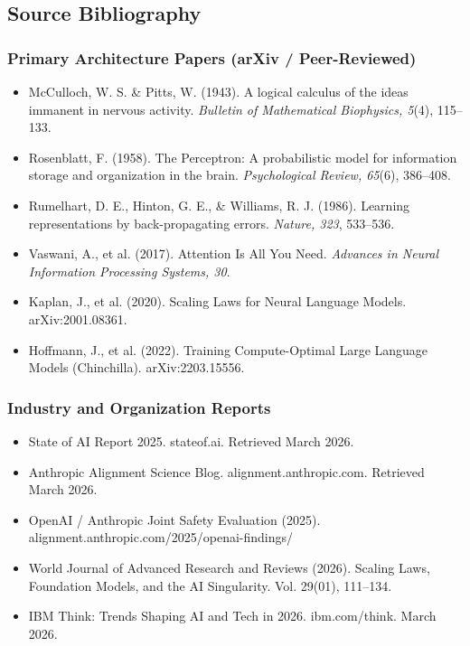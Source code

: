 \documentclass[11pt,letterpaper]{article}
\begin{document}
\subsection{Source Bibliography}

\subsubsection{Primary Architecture Papers (arXiv / Peer-Reviewed)}
\begin{itemize}[leftmargin=*]
\item McCulloch, W. S. \& Pitts, W. (1943). A logical calculus of the ideas immanent in nervous activity. \textit{Bulletin of Mathematical Biophysics, 5}(4), 115--133.
\item Rosenblatt, F. (1958). The Perceptron: A probabilistic model for information storage and organization in the brain. \textit{Psychological Review, 65}(6), 386--408.
\item Rumelhart, D. E., Hinton, G. E., \& Williams, R. J. (1986). Learning representations by back-propagating errors. \textit{Nature, 323}, 533--536.
\item Vaswani, A., et al. (2017). Attention Is All You Need. \textit{Advances in Neural Information Processing Systems, 30}.
\item Kaplan, J., et al. (2020). Scaling Laws for Neural Language Models. arXiv:2001.08361.
\item Hoffmann, J., et al. (2022). Training Compute-Optimal Large Language Models (Chinchilla). arXiv:2203.15556.
\end{itemize}

\subsubsection{Industry and Organization Reports}
\begin{itemize}[leftmargin=*]
\item State of AI Report 2025. stateof.ai. Retrieved March 2026.
\item Anthropic Alignment Science Blog. alignment.anthropic.com. Retrieved March 2026.
\item OpenAI / Anthropic Joint Safety Evaluation (2025). alignment.anthropic.com/2025/openai-findings/
\item World Journal of Advanced Research and Reviews (2026). Scaling Laws, Foundation Models, and the AI Singularity. Vol. 29(01), 111--134.
\item IBM Think: Trends Shaping AI and Tech in 2026. ibm.com/think. March 2026.
\end{itemize}
\end{document}
